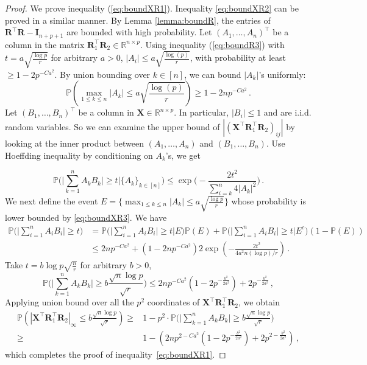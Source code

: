 \documentclass[10pt,a4paper]{amsart}
\newcommand{\Prob}{\mathbb{P}}
\newcommand{\bI}{\boldsymbol{I}}
\newcommand{\bR}{\boldsymbol{R}}
\newcommand{\bX}{\boldsymbol{X}}
\begin{document}
\begin{proof} 
We prove inequality (\ref{eq:boundXR1}). Inequality \eqref{eq:boundXR2} can be proved in a similar manner. By Lemma \ref{lemma:boundR}, the entries of $\bR^\top\bR-\bI_{n+p+1}$ are bounded with high probability. Let $(A_1,\dotsc,A_n)^\top$ be a column in the matrix $\bR_1^\top \bR_2\in\mathbb{R}^{n\times p}$. Using inequality (\ref{eq:boundR3}) with $t = a\sqrt{\frac{\log p}{r}}$ for arbitrary $a>0$,  $|A_i|\leq a\sqrt{\frac{\log (p)}{r}}$, with probability at least $\geq 1-2p^{-Ca^2}$. By union bounding over $k\in[n]$, we can bound $|A_k|$'s uniformly:
\begin{equation}\label{eq:boundXR3}
    \Prob\left(\max_{1\leq k\leq n} |A_k|\leq a \sqrt{\frac{\log (p)}{r}}\right)\geq 1-2np^{-Ca^2}\,.
\end{equation}
Let $(B_1,\dotsc,B_n)^\top$ be a column in $\bX\in\mathbb{R}^{n\times p}$. In particular, $|B_i|\leq 1$ and are i.i.d. random variables. So we can examine the upper bound of $|(\bX^\top \bR_1^\top \bR_2)_{ij}|$ by looking at the inner product between $(A_1,\dotsc,A_n)$ and $(B_1,\dotsc,B_n)$. Use Hoeffding inequality by conditioning on $A_k$'s, we get

\[\Prob\bigg(\bigg|\sum_{k=1}^nA_kB_k\bigg|\geq t\bigg|\{A_k\}_{k\in[n]}\bigg)\leq \exp\bigg(-\frac{2t^2}{\sum_{i=k}^n 4|A_k|^2}\bigg)\,.\]
We next define the event $E = \bigg\{\max_{1\leq k\leq n} |A_k|\leq a \sqrt{\frac{\log p}{r}}\bigg\}$ whose probability is lower bounded by \eqref{eq:boundXR3}. We have 
\begin{align*}
    \Prob\bigg(\bigg|\sum_{i=1}^nA_iB_i\bigg|\geq t\bigg) &=  \Prob\bigg(\bigg|\sum_{i=1}^nA_iB_i\bigg|\geq t\bigg|E\bigg)\Prob(E)+\Prob\bigg(\bigg|\sum_{i=1}^nA_iB_i\bigg|\geq t\bigg|E^c\bigg)(1-\Prob(E))\\
        &\le  2np^{-Ca^2}+(1-2np^{-Ca^2})2\exp\left(-\frac{2t^2}{4a^2n(\log p)/r}\right)\,.
\end{align*}
Take $t = b\log p\sqrt{\frac{n}{r}}$ for arbitrary $b>0$,
\[\Prob\bigg(\bigg|\sum_{k=1}^nA_kB_k\bigg|\geq b\frac{\sqrt{n}\log p}{\sqrt{r}}\bigg)\leq  2np^{-Ca^2}(1-2p^{-\frac{b^2}{2a^2}})+2p^{-\frac{b^2}{2a^2}}\,,\]
Applying union bound over all the $p^2$ coordinates of $\bX^\top \bR_1^\top \bR_2$, we obtain
\small
\begin{align*}
    \Prob\left(|\bX^\top \bR_1^\top \bR_2|_\infty\leq b\frac{\sqrt{n}\log p}{\sqrt{r}}\right)\geq & 1-p^2\cdot\Prob\bigg(\bigg|\sum_{k=1}^nA_kB_k\bigg|\geq b\frac{\sqrt{n}\log p}{\sqrt{r}}\bigg)\\
    \geq &1- \left(2np^{2-Ca^2}(1-2p^{-\frac{b^2}{2a^2}})+2p^{2-\frac{b^2}{2a^2}}\right)\,,
\end{align*}
\normalsize
which completes the proof of inequality~\eqref{eq:boundXR1}. 
\end{proof}
\end{document}
